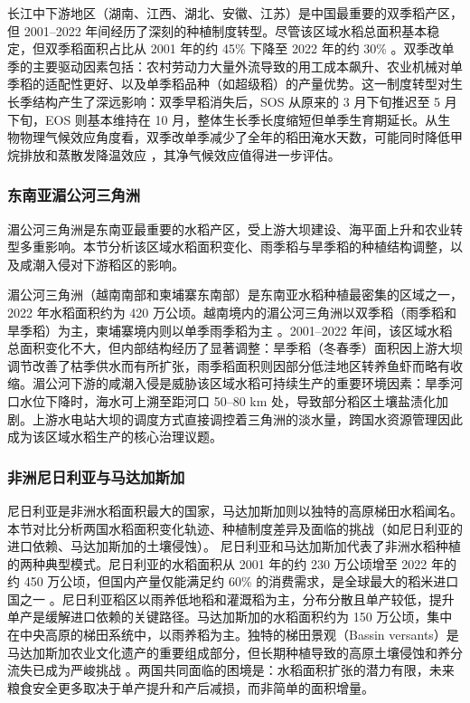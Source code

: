 长江中下游地区（湖南、江西、湖北、安徽、江苏）是中国最重要的双季稻产区，但 2001--2022 年间经历了深刻的种植制度转型。尽管该区域水稻总面积基本稳定，但双季稻面积占比从 2001 年的约 45\% 下降至 2022 年的约 30\% 。双季改单季的主要驱动因素包括：农村劳动力大量外流导致的用工成本飙升、农业机械对单季稻的适配性更好、以及单季稻品种（如超级稻）的产量优势。这一制度转型对生长季结构产生了深远影响：双季早稻消失后，SOS 从原来的 3 月下旬推迟至 5 月下旬，EOS 则基本维持在 10 月，整体生长季长度缩短但单季生育期延长。从生物物理气候效应角度看，双季改单季减少了全年的稻田淹水天数，可能同时降低甲烷排放和蒸散发降温效应 \cite{Zhang2020NatCommun}，其净气候效应值得进一步评估。

\subsubsection{东南亚湄公河三角洲}
湄公河三角洲是东南亚最重要的水稻产区，受上游大坝建设、海平面上升和农业转型多重影响。本节分析该区域水稻面积变化、雨季稻与旱季稻的种植结构调整，以及咸潮入侵对下游稻区的影响。

湄公河三角洲（越南南部和柬埔寨东南部）是东南亚水稻种植最密集的区域之一，2022 年水稻面积约为 420 万公顷。越南境内的湄公河三角洲以双季稻（雨季稻和旱季稻）为主，柬埔寨境内则以单季雨季稻为主 。2001--2022 年间，该区域水稻总面积变化不大，但内部结构经历了显著调整：旱季稻（冬春季）面积因上游大坝调节改善了枯季供水而有所扩张，雨季稻面积则因部分低洼地区转养鱼虾而略有收缩。湄公河下游的咸潮入侵是威胁该区域水稻可持续生产的重要环境因素：旱季河口水位下降时，海水可上溯至距河口 50--80 km 处，导致部分稻区土壤盐渍化加剧。上游水电站大坝的调度方式直接调控着三角洲的淡水量，跨国水资源管理因此成为该区域水稻生产的核心治理议题。

\subsubsection{非洲尼日利亚与马达加斯加}

尼日利亚是非洲水稻面积最大的国家，马达加斯加则以独特的高原梯田水稻闻名。本节对比分析两国水稻面积变化轨迹、种植制度差异及面临的挑战（如尼日利亚的进口依赖、马达加斯加的土壤侵蚀）。
尼日利亚和马达加斯加代表了非洲水稻种植的两种典型模式。尼日利亚的水稻面积从 2001 年的约 230 万公顷增至 2022 年的约 450 万公顷，但国内产量仅能满足约 60\% 的消费需求，是全球最大的稻米进口国之一 。尼日利亚稻区以雨养低地稻和灌溉稻为主，分布分散且单产较低，提升单产是缓解进口依赖的关键路径。马达加斯加的水稻面积约为 150 万公顷，集中在中央高原的梯田系统中，以雨养稻为主。独特的梯田景观（Bassin versants）是马达加斯加农业文化遗产的重要组成部分，但长期种植导致的高原土壤侵蚀和养分流失已成为严峻挑战 \cite{Foley2005}。两国共同面临的困境是：水稻面积扩张的潜力有限，未来粮食安全更多取决于单产提升和产后减损，而非简单的面积增量。

